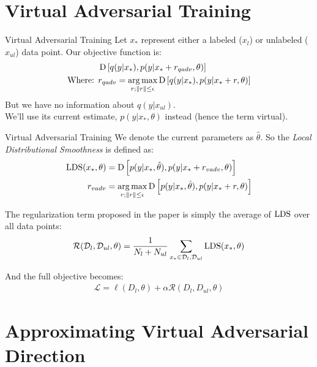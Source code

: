 \section{Virtual Adversarial Training}
\begin{frame}{Virtual Adversarial Training}
Let \(x_*\) represent either a labeled (\(x_l\)) or unlabeled (\(x_{ul}\)) data point.
Our objective function is:
\begin{align*}
&\operatorname*{D} \left[q(y | x_*), p(y | x_* + r_{qadv}, \theta)\right]\\
\text{Where: } &r_{qadv} = \operatorname*{arg\,max}_{r; \left\lVert r\right\rVert \le \epsilon} \operatorname*{D} \left[q(y | x_*), p(y | x_* + r, \theta)\right]
\end{align*}
\pause
But we have no information about \(q(y | x_{ul})\).\\
\pause
We'll use its current estimate, \(p(y | x_*, \theta)\) instead (hence the term virtual).
\end{frame}

\begin{frame}{Virtual Adversarial Training}
We denote the current parameters as \(\hat{\theta}\). So the \textit{Local Distributional Smoothness} is defined as:
\begin{align*}
\operatorname*{LDS}(x_*, \theta) &= \operatorname*{D} \left[p(y | x_*, \hat{\theta}), p(y | x_* + r_{vadv}, \theta)\right]\\
r_{vadv} &= \operatorname*{arg\,max}_{r; \left\lVert r\right\rVert \le \epsilon} \operatorname*{D} \left[p(y | x_*, \hat{\theta}), p(y | x_* + r, \theta)\right]
\end{align*}

\end{frame}


\begin{frame}{}
The regularization term proposed in the paper is simply the average of \(\operatorname*{LDS}\) over all data points:
\begin{align*}
\mathcal{R}(\mathcal{D}_l, \mathcal{D}_{ul}, \theta) = \frac{1}{N_l + N_{ul}} \sum_{x_* \in \mathcal{D}_l, \mathcal{D}_{ul}} \operatorname*{LDS}(x_*, \theta)
\end{align*}
    
And the full objective becomes:
\begin{align*}
\mathcal{L} = \ell(D_l, \theta) + \alpha \mathcal{R}(D_l, D_{ul}, \theta)
\end{align*}
\end{frame}

\section{Approximating Virtual Adversarial Direction}

